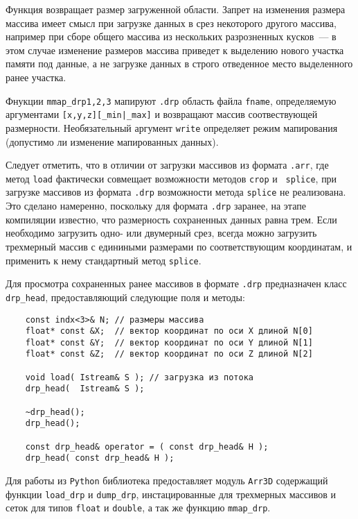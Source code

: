 Функция возвращает размер загруженной области. Запрет на изменения размера массива
имеет смысл при загрузке данных в срез некоторого другого массива, например при
сборе общего массива из нескольких разрозненных кусков~--- в этом случае
изменение размеров массива приведет к выделению нового участка памяти под
данные, а не загрузке данных в строго отведенное место выделенного ранее участка.

Фнукции {\tt mmap\_drp1,2,3} мапируют {\tt.drp} область файла {\tt fname},
определяемую аргументами {\tt [x,y,z][\_min|\_max]} и возвращают
массив соотвествующей размерности. Необязательный аргумент {\tt write} определяет режим
мапирования (допустимо ли изменение мапированных данных).

Следует отметить, что в отличии от загрузки массивов из формата {\tt .arr}, где
метод {\tt load} фактически  совмещает возможности методов {\tt crop} и {\tt
  splice}, при загрузке массивов из формата {\tt .drp} возможности метода {\tt splice} не
реализована. Это сделано намеренно, поскольку для формата {\tt .drp} заранее,
на этапе компиляции известно, что размерность сохраненных данных равна
трем. Если необходимо загрузить одно- или двумерный срез, всегда можно
загрузить трехмерный массив с единиными размерами по соответствующим
координатам, и применить к нему стандартный метод {\tt splice}. 

Для просмотра сохраненных ранее массивов в формате {\tt .drp} предназначен
класс \verb'drp_head', предоставляющий следующие поля и методы:
\begin{verbatim}
    const indx<3>& N; // размеры массива
    float* const &X;  // вектор координат по оси X длиной N[0]
    float* const &Y;  // вектор координат по оси Y длиной N[1]
    float* const &Z;  // вектор координат по оси Z длиной N[2]

    void load( Istream& S ); // загрузка из потока
    drp_head(  Istream& S );

    ~drp_head();
    drp_head();

    const drp_head& operator = ( const drp_head& H );
    drp_head( const drp_head& H );
\end{verbatim}


Для работы из {\tt Python} библиотека предоставляет модуль {\tt Arr3D}
содержащий функции {\tt load\_drp} и {\tt dump\_drp}, инстацированные для трехмерных
массивов и сеток для типов {\tt float} и {\tt double}, а так же функцию {\tt mmap\_drp}.

